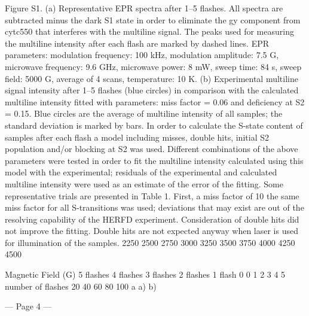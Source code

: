 Figure S1. (a) Representative EPR spectra after 1–5 flashes. All spectra are subtracted minus the dark S1 state 
in order to eliminate the gy component from cytc550 that interferes with the multiline signal. The peaks used for 
measuring the multiline intensity after each flash are marked by dashed lines. EPR parameters: modulation 
frequency: 100 kHz, modulation amplitude: 7.5 G, microwave frequency: 9.6 GHz, microwave power: 8 mW, 
sweep time: 84 s, sweep field: 5000 G, average of 4 scans, temperature: 10 K. (b) Experimental multiline signal 
intensity after 1–5 flashes (blue circles) in comparison with the calculated multiline intensity fitted with 
parameters: miss factor = 0.06 and deficiency at S2 = 0.15. Blue circles are the average of multiline intensity of 
all samples; the standard deviation is marked by bars.  
In order to calculate the S-state content of samples after each flash a model including misses, 
double hits, initial S2 population and/or blocking at S2 was used. Different combinations of the 
above parameters were tested in order to fit the multiline intensity calculated using this model with 
the experimental; residuals of the experimental and calculated multiline intensity were used as an 
estimate of the error of the fitting. Some representative trials are presented in Table 1. First, a miss 
factor of 10%
the same miss factor for all S-transitions was used; deviations that may exist are out of the 
resolving capability of the HERFD experiment. Consideration of double hits did not improve the 
fitting. Double hits are not expected anyway when laser is used for illumination of the samples. 
2250
2500
2750
3000
3250
3500
3750
4000
4250
4500
 
 
 Magnetic Field (G)
5 ﬂashes
4 ﬂashes
3 ﬂashes
2 ﬂashes
1 ﬂash
0
0
1
2
3
4
5
number of flashes
20
40
60
80
100
a
 a)
 b)


--- Page 4 ---
 
